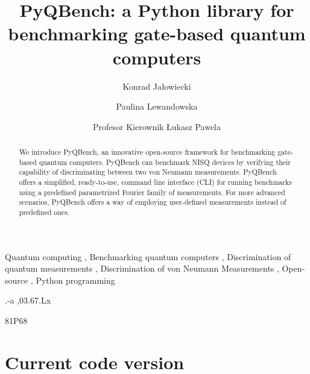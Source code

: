 \documentclass[preprint,12pt, a4paper]{elsarticle}
\newcommand{\1}{{\rm 1\hspace{-0.9mm}l}}
\begin{document}
\begin{frontmatter}

\title{PyQBench: a Python library for benchmarking gate-based quantum computers}

\author{Konrad Jałowiecki}

\author{Paulina Lewandowska}
\author{Profesor Kierownik \L ukasz Pawela}

\address{Institute of Theoretical and Applied Informatics, Polish Academy
	of Sciences, Ba{\l}tycka 5, 44-100 Gliwice, Poland}

\begin{abstract}
We introduce PyQBench, an innovative open-source framework for benchmarking 
gate-based quantum computers. PyQBench can benchmark NISQ devices by verifying their capability of
discriminating between two von Neumann measurements. PyQBench offers a simplified, ready-to-use,
command line interface (CLI) for running benchmarks using a predefined parametrized Fourier
family of measurements. For more advanced scenarios, PyQBench offers a way of employing user-defined
measurements instead of predefined ones.

\end{abstract}

\begin{keyword}
Quantum computing \sep
Benchmarking quantum computers \sep 
Discrimination of quantum measurements \sep 
Discrimination of von Neumann Measurements \sep
Open-source \sep
Python programming

.-a \sep 03.67.Lx
		
\MSC 81P68

\end{keyword}

\end{frontmatter}



\section*{Current code version}
\label{}
\end{document}

